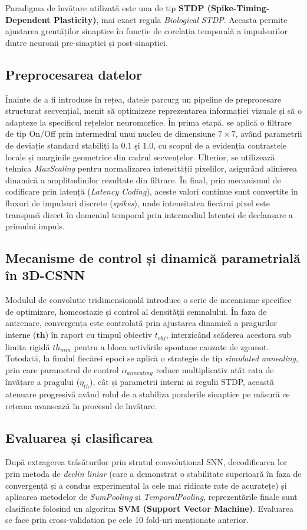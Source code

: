 Paradigma de învățare utilizată este una de tip \textbf{STDP (Spike-Timing-Dependent Plasticity)}, mai exact regula \textit{Biological STDP}. Aceasta permite ajustarea greutăților sinaptice în funcție de corelația temporală a impulsurilor dintre neuronii pre-sinaptici și post-sinaptici.

\subsection*{Preprocesarea datelor}
Înainte de a fi introduse în rețea, datele parcurg un pipeline de preprocesare structurat secvențial, menit să optimizeze reprezentarea informației vizuale și să o adapteze la specificul rețelelor neuromorfice. În prima etapă, se aplică o filtrare de tip On/Off prin intermediul unui nucleu de dimensiune $7 \times 7$, având parametrii de deviație standard stabiliți la $0.1$ și $1.0$, cu scopul de a evidenția contrastele locale și marginile geometrice din cadrul secvențelor. Ulterior, se utilizează tehnica \textit{MaxScaling} pentru normalizarea intensității pixelilor, asigurând alinierea dinamică a amplitudinilor rezultate din filtrare. În final, prin mecanismul de codificare prin latență (\textit{Latency Coding}), aceste valori continue sunt convertite în fluxuri de impulsuri discrete (\textit{spikes}), unde intensitatea fiecărui pixel este transpusă direct în domeniul temporal prin intermediul latenței de declanșare a primului impuls.

\subsection*{Mecanisme de control și dinamică parametrială în 3D-CSNN}
Modulul de convoluție tridimensională introduce o serie de mecanisme specifice de optimizare, homeostazie și control al densității semnalului. În faza de antrenare, convergența este controlată prin ajustarea dinamică a pragurilor interne ($\mathbf{th}$) în raport cu timpul obiectiv $t_{obj}$, interzicând scăderea acestora sub limita rigidă $th_{min}$ pentru a bloca activările spontane cauzate de zgomot. Totodată, la finalul fiecărei epoci se aplică o strategie de tip \textit{simulated annealing}, prin care parametrul de control $\alpha_{annealing}$ reduce multiplicativ atât rata de învățare a pragului ($\eta_{th}$), cât și parametrii interni ai regulii STDP, această atenuare progresivă având rolul de a stabiliza ponderile sinaptice pe măsură ce rețeaua avansează în procesul de învățare.

\subsection*{Evaluarea și clasificarea}
După extragerea trăsăturilor prin stratul convoluțional SNN, decodificarea lor prin metoda de \textit{declin liniar} (care a demonstrat o stabilitate superioară în faza de convergență și a condus experimental la cele mai ridicate rate de acuratețe) și aplicarea metodelor de \textit{SumPooling} și \textit{TemporalPooling}, reprezentările finale sunt clasificate folosind un algoritm \textbf{SVM (Support Vector Machine)}. Evaluarea se face prin cross-validation pe cele 10 fold-uri menționate anterior.

